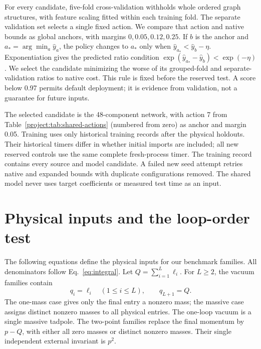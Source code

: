 For every candidate, five-fold cross-validation withholds whole ordered graph structures, with feature scaling fitted within each training fold. The separate validation set selects a single fixed action. We compare that action and native bounds as global anchors, with margins $0,0.05,0.12,0.25$. If $b$ is the anchor and $a_* =\arg\min_a\widehat y_a$, the policy changes to $a_*$ only when $\widehat y_{a_*}<\widehat y_b-\eta$. Exponentiation gives the predicted ratio condition $\exp(\widehat y_{a_*}-\widehat y_b)<\exp(-\eta)$. We select the candidate minimizing the worse of its grouped-fold and separate-validation ratios to native cost. This rule is fixed before the reserved test. A score below 0.97 permits default deployment; it is evidence from validation, not a guarantee for future inputs.

The selected candidate is the 48-component network, with action 7 from Table~\ref{project:tab:shared-actions} (numbered from zero) as anchor and margin 0.05. Training uses only historical training records after the physical holdouts. Their historical timers differ in whether initial imports are included; all new reserved controls use the same complete fresh-process timer. The training record contains every source and model candidate. A failed new seed attempt retries native and expanded bounds with duplicate configurations removed. The shared model never uses target coefficients or measured test time as an input.

\section{Physical inputs and the loop-order test}
\label{project:app:families-new}
The following equations define the physical inputs for our benchmark families. All denominators follow Eq.~\eqref{eq:integral}. Let $Q=\sum_{i=1}^{L}\ell_i$. For $L\geq2$, the vacuum families contain
\begin{equation}
 q_i=\ell_i\quad(1\leq i\leq L),\qquad q_{L+1}=Q.
 \label{project:eq:vacuum-new}
\end{equation}
The one-mass case gives only the final entry a nonzero mass; the massive case assigns distinct nonzero masses to all physical entries. The one-loop vacuum is a single massive tadpole. The two-point families replace the final momentum by $p-Q$, with either all zero masses or distinct nonzero masses. Their single independent external invariant is $p^2$.

